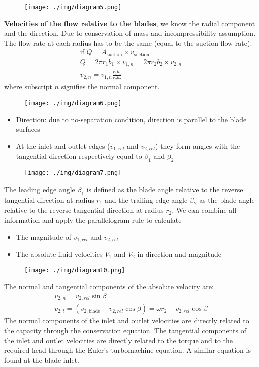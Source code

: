 \begin{figure}[H]
  \centering
  \texttt{[image: ./img/diagram5.png]}
\end{figure}
\textbf{Velocities of the flow relative to the blades}, we know the radial component and the direction. Due to conservation of mass and incompressibility assumption. The flow rate at each radius has to be the same (equal to the suction flow rate).
\begin{gather}
  \textrm{if } Q = A_{\textrm{suction}} \times v_{\textrm{suction}}\\
  Q = 2 \pi r_1 b_1 \times v_{1, n} = 2\pi r_2 b_2 \times v_{2, n}\\
  v_{2, n} = v_{1, n} \frac{r_1 b_1}{r_2 b_2}
\end{gather}
where subscript $n$ signifies the normal component.
\begin{figure}[H]
  \centering
  \texttt{[image: ./img/diagram6.png]}
\end{figure}
\begin{itemize}
  \item Direction: due to no-separation condition, direction is parallel to the blade surfaces
  \item At the inlet and outlet edges ($v_{1, rel}$ and $v_{2, rel}$) they form angles with the tangential direction respectively equal to $\beta_1$ and $\beta_2$
\end{itemize}
\begin{figure}[H]
  \centering
  \texttt{[image: ./img/diagram7.png]}
\end{figure}
The leading edge angle $\beta_1$ is defined as the blade angle relative to the reverse tangential direction at radius $r_1$ and the trailing edge angle $\beta_2$ as the blade angle relative to the reverse tangential direction at radius $r_2$. We can combine all information and apply the parallelogram rule to calculate
\begin{itemize}
  \item The magnitude of $v_{1, rel}$ and $v_{2, rel}$
  \item The absolute fluid velocities $V_1$ and $V_2$ in direction and magnitude
\end{itemize}
\begin{figure}[H]
  \centering
  \texttt{[image: ./img/diagram10.png]}
\end{figure}
The normal and tangential components of the absolute velocity are:
\begin{gather}
  v_{2,n} = v_{2,rel} \sin{\beta} \\
  v_{2,t} = (v_{2,\textrm{blade}} - v_{2, rel} \cos{\beta}) = \omega r_2 - v_{2,rel}\cos{\beta}
\end{gather}
The normal components of the inlet and outlet velocities are directly related to the capacity through the conservation equation. The tangential components of the inlet and outlet velocities are directly related to the torque and to the required head through the Euler's turbomachine equation. A similar equation is found at the blade inlet.
